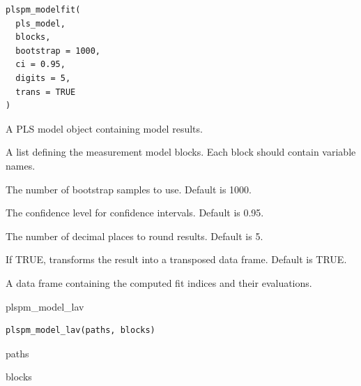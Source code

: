 \documentclass[a4paper]{book}
\begin{document}
%
\begin{Usage}
\begin{verbatim}
plspm_modelfit(
  pls_model,
  blocks,
  bootstrap = 1000,
  ci = 0.95,
  digits = 5,
  trans = TRUE
)
\end{verbatim}
\end{Usage}
%
\begin{Arguments}
\begin{ldescription}
\item[\code{pls\_model}] A PLS model object containing model results.

\item[\code{blocks}] A list defining the measurement model blocks. Each block should contain variable names.

\item[\code{bootstrap}] The number of bootstrap samples to use. Default is 1000.

\item[\code{ci}] The confidence level for confidence intervals. Default is 0.95.

\item[\code{digits}] The number of decimal places to round results. Default is 5.

\item[\code{trans}] If TRUE, transforms the result into a transposed data frame. Default is TRUE.
\end{ldescription}
\end{Arguments}
%
\begin{Value}
A data frame containing the computed fit indices and their evaluations.
\end{Value}
%
\begin{Description}
plspm\_model\_lav
\end{Description}
%
\begin{Usage}
\begin{verbatim}
plspm_model_lav(paths, blocks)
\end{verbatim}
\end{Usage}
%
\begin{Arguments}
\begin{ldescription}
\item[\code{paths}] paths

\item[\code{blocks}] blocks
\end{ldescription}
\end{Arguments}
%
\end{document}
